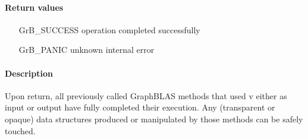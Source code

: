 \paragraph{Return values}
\begin{itemize}[leftmargin=2.1in]
\item[{\sf GrB\_SUCCESS}]	operation completed successfully
\item[{\sf GrB\_PANIC}]		unknown internal error
\end{itemize}

\paragraph{Description}

Upon return, all previously called GraphBLAS methods that used {\sf v} either as input or output have fully completed their execution.
Any (transparent or opaque) data structures produced or manipulated by those methods can be safely touched.
